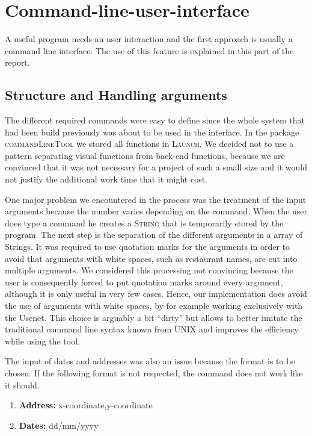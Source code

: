 \section{Command-line-user-interface}
\label{sec:command_line_user_interface}

A useful program needs an user interaction and the first approach is usually a command line 
interface. The use of this feature is explained in this part of the report.

\subsection{Structure and Handling arguments}
\label{sub:structure_and_handling_arguments}

The different required commands were easy to define since the whole system that had been build 
previously was about to be used in the interface. In the package \textsc{commandLineTool} we 
stored all functions in \textsc{Launch}. We decided not to use a pattern separating
visual functions from back-end functions, because we are convinced that it was not necessary for a
project of such a small size and it would not justify the additional work time that it might 
cost.

One major problem we encountered in the process was the treatment of the input arguments because 
the number varies depending on the command. When the user does type a command he creates a 
\textsc{String} that is temporarily stored by the program. The next step is the separation of 
the different arguments in a array of Strings. It was required to use quotation marks for the 
arguments in order to avoid that arguments with white spaces, such as restaurant names,  are cut
into multiple arguments.
We considered this processing not convincing because the user is consequently forced to put 
quotation marks around every argument, although it is only useful in very few cases. Hence, 
our implementation does avoid the use of arguments with white spaces, by for example working 
exclusively with the Usenet. This choice is arguably a bit ``dirty'' but allows to better 
imitate the traditional command line syntax known from \textsc{UNIX} and improves the efficiency 
while using the tool.

The input of dates and addresses was also an issue because the format is to be chosen. If the 
following format is not respected, the command does not work like it should.
\begin{enumerate}
	\item \textbf{Address: } x-coordinate,y-coordinate
	\item \textbf{Dates: } dd/mm/yyyy
\end{enumerate}

